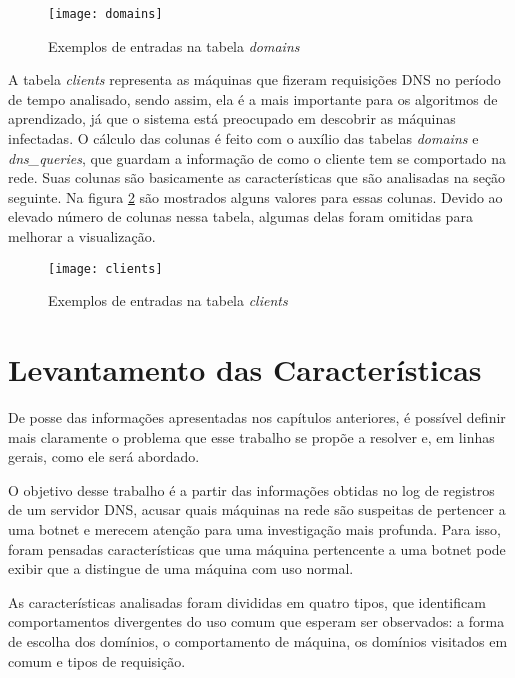 \begin{figure}
\texttt{[image: domains]}
\caption[Exemplos de entradas na tabela \textit{domains}]{Exemplos de entradas na tabela \textit{domains}} \label{fig:domains}
\end{figure}

A tabela \textit{clients} representa as máquinas que fizeram requisições DNS no período de tempo analisado, sendo assim, ela é a mais importante para os algoritmos de aprendizado, já que o sistema está preocupado em descobrir as máquinas infectadas. O cálculo das colunas é feito com o auxílio das tabelas \textit{domains} e \textit{dns\_queries}, que guardam a informação de como o cliente tem se comportado na rede. Suas colunas são basicamente as características que são analisadas na seção seguinte. Na figura \ref{fig:clients} são mostrados alguns valores para essas colunas. Devido ao elevado número de colunas nessa tabela, algumas delas foram omitidas para melhorar a visualização.

\begin{figure}
\texttt{[image: clients]}
\caption[Exemplos de entradas na tabela \textit{clients}]{Exemplos de entradas na tabela \textit{clients}} \label{fig:clients}
\end{figure}

\section{Levantamento das Características}
De posse das informações apresentadas nos capítulos anteriores, é possível definir mais claramente o problema que esse trabalho se propõe a resolver e, em linhas gerais, como ele será abordado.

O objetivo desse trabalho é a partir das informações obtidas no log de registros de um servidor DNS, acusar quais máquinas na rede são suspeitas de pertencer a uma botnet e merecem atenção para uma investigação mais profunda. Para isso, foram pensadas características que uma máquina pertencente a uma botnet pode exibir que a distingue de uma máquina com uso normal.

As características analisadas foram divididas em quatro tipos, que identificam comportamentos divergentes do uso comum que esperam ser observados: a forma de escolha dos domínios, o comportamento de máquina, os domínios visitados em comum e tipos de requisição.

